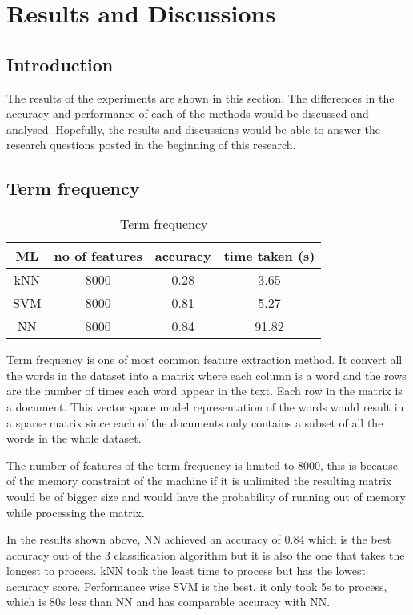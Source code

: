 
\chapter{Results and Discussions}

\section{Introduction}
The results of the experiments are shown in this section. The differences in the accuracy and performance of each of the methods would be discussed and analysed. Hopefully, the results and discussions would be able to answer the research questions posted in the beginning of this research.

\section{Term frequency}

\begin{table}[ht]
	\centering
	\begin{tabular}{|| c | c | c | c||}
		\hline
		ML & no of features & accuracy & time taken (s) \\ [0.5ex]
		\hline\hline
		kNN & 8000 & 0.28 & 3.65 \\ 
		\hline
		SVM & 8000 & 0.81 & 5.27 \\
		\hline
		NN & 8000 & 0.84 & 91.82 \\
		\hline
	\end{tabular}
\caption{Term frequency}
\label{tbl:termFrequency}
\end{table}

Term frequency is one of most common feature extraction method. It convert all the words in the dataset into a matrix where each column is a word and the rows are the number of times each word appear in the text. Each row in the matrix is a document. This vector space model representation of the words would result in a sparse matrix since each of the documents only contains a subset of all the words in the whole dataset. 

The number of features of the term frequency is limited to 8000, this is because of the memory constraint of the machine if it is unlimited the resulting matrix would be of bigger size and would have the probability of running out of memory while processing the matrix. 

In the results shown above, NN achieved an accuracy of 0.84 which is the best accuracy out of the 3 classification algorithm but it is also the one that takes the longest to process. kNN took the least time to process but has the lowest accuracy score. Performance wise SVM is the best, it only took 5s to process, which is 80s less than NN and has comparable accuracy with NN. 

